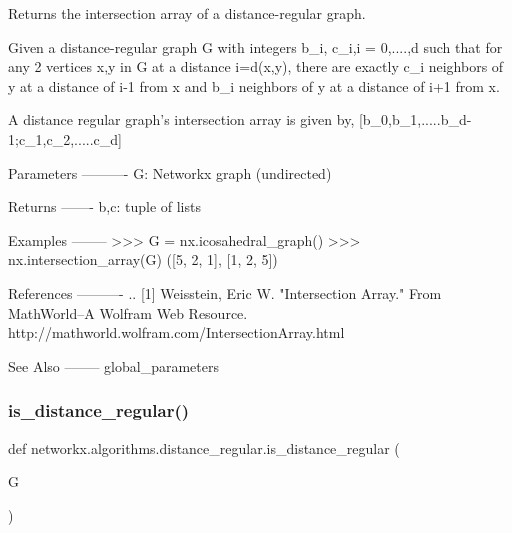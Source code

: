 \begin{DoxyVerb}Returns the intersection array of a distance-regular graph.

Given a distance-regular graph G with integers b_i, c_i,i = 0,....,d
such that for any 2 vertices x,y in G at a distance i=d(x,y), there
are exactly c_i neighbors of y at a distance of i-1 from x and b_i
neighbors of y at a distance of i+1 from x.

A distance regular graph's intersection array is given by,
[b_0,b_1,.....b_{d-1};c_1,c_2,.....c_d]

Parameters
----------
G: Networkx graph (undirected)

Returns
-------
b,c: tuple of lists

Examples
--------
>>> G = nx.icosahedral_graph()
>>> nx.intersection_array(G)
([5, 2, 1], [1, 2, 5])

References
----------
.. [1] Weisstein, Eric W. "Intersection Array."
   From MathWorld--A Wolfram Web Resource.
   http://mathworld.wolfram.com/IntersectionArray.html

See Also
--------
global_parameters
\end{DoxyVerb}
 \mbox{\label{namespacenetworkx_1_1algorithms_1_1distance__regular_ae927cf8919904b4358d8e66e000a3c7d}} 
\subsubsection{\texorpdfstring{is\+\_\+distance\+\_\+regular()}{is\_distance\_regular()}}
{\footnotesize\ttfamily def networkx.\+algorithms.\+distance\+\_\+regular.\+is\+\_\+distance\+\_\+regular (\begin{DoxyParamCaption}\item[{}]{G }\end{DoxyParamCaption})}

